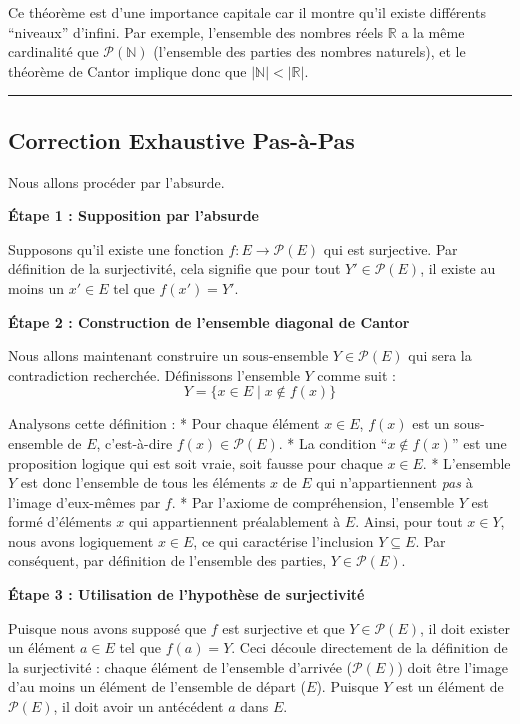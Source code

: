 \documentclass[12pt,a4paper]{report}
\begin{document}
Ce théorème est d'une importance capitale car il montre qu'il existe
différents ``niveaux'' d'infini. Par exemple, l'ensemble des nombres
réels \(\mathbb{R}\) a la même cardinalité que
\(\mathcal{P}(\mathbb{N})\) (l'ensemble des parties des nombres
naturels), et le théorème de Cantor implique donc que
\(|\mathbb{N}| < |\mathbb{R}|\).

\begin{center}\rule{0.5\linewidth}{0.5pt}\end{center}

\subsection{Correction Exhaustive
Pas-à-Pas}\label{correction-exhaustive-pas-uxe0-pas}

Nous allons procéder par l'absurde.

\textbf{Étape 1 : Supposition par l'absurde}

Supposons qu'il existe une fonction \(f: E \to \mathcal{P}(E)\) qui est
surjective. Par définition de la surjectivité, cela signifie que pour
tout \(Y' \in \mathcal{P}(E)\), il existe au moins un \(x' \in E\) tel
que \(f(x') = Y'\).

\textbf{Étape 2 : Construction de l'ensemble diagonal de Cantor}

Nous allons maintenant construire un sous-ensemble
\(Y \in \mathcal{P}(E)\) qui sera la contradiction recherchée.
Définissons l'ensemble \(Y\) comme suit :
\[ Y = \{x \in E \mid x \notin f(x)\} \]

Analysons cette définition : * Pour chaque élément \(x \in E\), \(f(x)\)
est un sous-ensemble de \(E\), c'est-à-dire \(f(x) \in \mathcal{P}(E)\).
* La condition ``\(x \notin f(x)\)'' est une proposition logique qui est
soit vraie, soit fausse pour chaque \(x \in E\). * L'ensemble \(Y\) est
donc l'ensemble de tous les éléments \(x\) de \(E\) qui n'appartiennent
\emph{pas} à l'image d'eux-mêmes par \(f\). * Par l'axiome de
compréhension, l'ensemble \(Y\) est formé d'éléments \(x\) qui
appartiennent préalablement à \(E\). Ainsi, pour tout \(x \in Y\), nous
avons logiquement \(x \in E\), ce qui caractérise l'inclusion
\(Y \subseteq E\). Par conséquent, par définition de l'ensemble des
parties, \(Y \in \mathcal{P}(E)\).

\textbf{Étape 3 : Utilisation de l'hypothèse de surjectivité}

Puisque nous avons supposé que \(f\) est surjective et que
\(Y \in \mathcal{P}(E)\), il doit exister un élément \(a \in E\) tel que
\(f(a) = Y\). Ceci découle directement de la définition de la
surjectivité : chaque élément de l'ensemble d'arrivée
(\(\mathcal{P}(E)\)) doit être l'image d'au moins un élément de
l'ensemble de départ (\(E\)). Puisque \(Y\) est un élément de
\(\mathcal{P}(E)\), il doit avoir un antécédent \(a\) dans \(E\).
\end{document}
